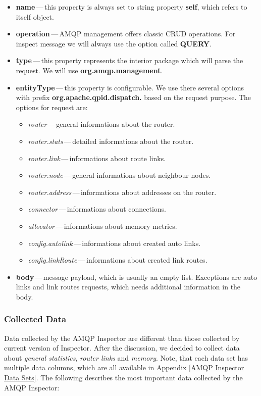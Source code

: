 \begin{itemize}
	\setlength\itemsep{0em}
		\item \textbf{name}\,---\,this property is always set to string property \textbf{self}, which refers to itself object.
		\item \textbf{operation}\,---\,AMQP management offers classic CRUD operations. For inspect message we will always use the option called \textbf{QUERY}.
		\item \textbf{type}\,---\,this property represents the interior package which will parse the request. We will use \textbf{org.amqp.management}.
		\item \textbf{entityType}\,---\,this property is configurable. We use there several options with prefix \textbf{org.apache.qpid.dispatch.} based on the request purpose. The options for request are:
		\begin{itemize}
			\setlength\itemsep{0em}
			\item \emph{router}\,---\,general informations about the router.
			\item \emph{router.stats}\,---\,detailed informations about the router.
			\item \emph{router.link}\,---\,informations about route links.
			\item \emph{router.node}\,---\,general informations about neighbour nodes.
			\item \emph{router.address}\,---\,informations about addresses on the router.
			\item \emph{connector}\,---\,informations about connections.
			\item \emph{allocator}\,---\,informations about memory metrics.
			\item \emph{config.autolink}\,---\,informations about created auto links.
			\item \emph{config.linkRoute}\,---\,informations about created link routes.
		\end{itemize}
		\item \textbf{body}\,---\,message payload, which is usually an empty list. Exceptions are auto links and link routes requests, which needs additional information in the body.
\end{itemize}

\subsubsection*{Collected Data}
\label{Collected Data}
Data collected by the AMQP Inspector are different than those collected by current version of Inspector. After the discussion, we decided to collect data about \emph{general statistics}, \emph{router links} and \emph{memory}. Note, that each data set has multiple data columns, which are all available in Appendix \ref{AMQP Inspector Data Sets}. The following describes the most important data collected by the AMQP Inspector:

